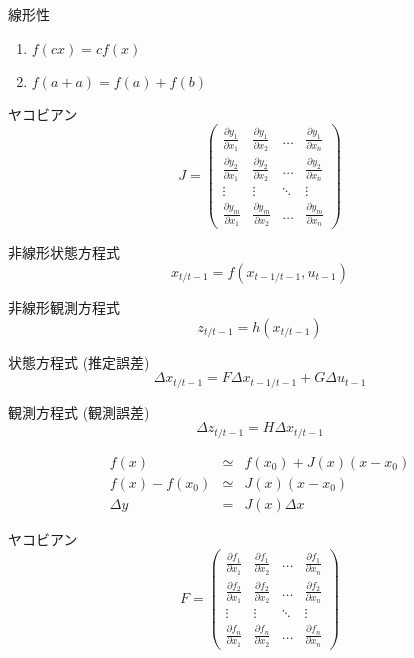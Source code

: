 \documentclass{jarticle}
\begin{document}
線形性
\begin{enumerate}
    \item $f(cx) = c f(x)$
    \item $f(a + a) = f(a) + f(b)$
\end{enumerate}


ヤコビアン
\[
  J = \left(
    \begin{array}{cccc}
      \frac{\partial y_{1}}{\partial x_{1}} & \frac{\partial y_{1}}{\partial x_{2}} & \ldots & \frac{\partial y_{1}}{\partial x_{n}} \\
      \frac{\partial y_{2}}{\partial x_{1}} & \frac{\partial y_{2}}{\partial x_{2}} & \ldots & \frac{\partial y_{2}}{\partial x_{n}} \\
      \vdots & \vdots & \ddots & \vdots \\
      \frac{\partial y_{m}}{\partial x_{1}} & \frac{\partial y_{m}}{\partial x_{2}} & \ldots & \frac{\partial y_{m}}{\partial x_{n}}
    \end{array}
  \right)
\]


非線形状態方程式
$$
x_{t/t-1} = f(x_{t-1/t-1}, u_{t-1})
$$

非線形観測方程式
$$
z_{t/t-1} = h(x_{t/t-1})
$$

状態方程式 (推定誤差)
$$
\Delta x_{t/t-1} = F \Delta x_{t-1/t-1} + G \Delta u_{t-1}
$$

観測方程式 (観測誤差)
$$
\Delta z_{t/t-1} = H \Delta x_{t/t-1}
$$


\begin{eqnarray}
f(x) &\simeq& f(x_0) + J(x) (x-x_0) \nonumber \\
f(x) - f(x_0) &\simeq& J(x) (x-x_0) \nonumber \\
\Delta y &=& J(x) \Delta x \nonumber
\end{eqnarray}


ヤコビアン
\[
  F = \left(
    \begin{array}{cccc}
      \frac{\partial f_{1}}{\partial x_{1}} & \frac{\partial f_{1}}{\partial x_{2}} & \ldots & \frac{\partial f_{1}}{\partial x_{n}} \\
      \frac{\partial f_{2}}{\partial x_{1}} & \frac{\partial f_{2}}{\partial x_{2}} & \ldots & \frac{\partial f_{2}}{\partial x_{n}} \\
      \vdots & \vdots & \ddots & \vdots \\
      \frac{\partial f_{n}}{\partial x_{1}} & \frac{\partial f_{n}}{\partial x_{2}} & \ldots & \frac{\partial f_{n}}{\partial x_{n}}
    \end{array}
  \right)
\]
\end{document}
